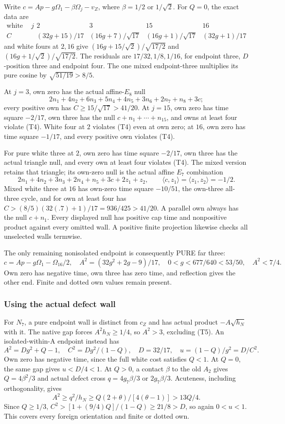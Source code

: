 \documentclass[11pt]{article}
\theoremstyle{definition}
\theoremstyle{remark}
\newcommand{\ip}[2]{\langle #1,#2\rangle}
\begin{document}
Write \(c=Ap-g\Omega_1-\beta\Omega_j-v_Z\), where
\(\beta=1/2\) or \(1/\sqrt2\).  For \(Q=0\), the exact data are
\[
\begin{array}{c|rrrr}
 \text{white three at }j&2&3&15&16\\ \hline
 C&(32g+15)/17&(16g+7)/\sqrt{17}&
   (16g+1)/\sqrt{17}&(32g+1)/17
\end{array}
\]
and white fours at \(2,16\) give
\((16g+15/\sqrt2)/\sqrt{17/2}\) and
\((16g+1/\sqrt2)/\sqrt{17/2}\).
The residuals are \(17/32,1/8,1/16\), for endpoint three,
\(D\)-position three and endpoint four.  The one mixed
endpoint-three multiplies its pure cosine by \(\sqrt{51/19}>8/5\).

At \(j=3\), own zero has the actual affine-\(E_8\) null
\[
 2n_1+4n_2+6n_3+5n_4+4n_5+3n_6+2n_7+n_8+3c;
\]
every positive own has \(C\ge15/\sqrt{17}>41/20\).
At \(j=15\), own zero has time square \(-2/17\), own three
has the null \(c+n_1+\cdots+n_{15}\), and owns at least four
violate (T4).  White four at \(2\) violates (T4) even at own zero;
at \(16\), own zero has time square \(-1/17\), and every
positive own violates (T4).

For pure white three at \(2\), own zero has time square \(-2/17\),
own three has the actual triangle null, and every own at least four
violates (T4).  The mixed version retains that triangle; its own-zero
null is the actual affine \(E_7\) combination
\[
 2n_1+4n_2+3n_3+2n_4+n_5+3c+2z_1+z_2,
 \qquad \ip c{z_1}=\ip{z_1}{z_2}=-1/2.
\]
Mixed white three at \(16\) has own-zero time square \(-10/51\),
the own-three all-three cycle, and for own at least four has
\(C>(8/5)(32(.7)+1)/17=936/425>41/20\).
A parallel own always has the null \(c+n_1\).
Every displayed null has positive cap time and nonpositive product
against every omitted wall.  A positive finite projection likewise
checks all unselected walls termwise.

The only remaining nonisolated endpoint is consequently PURE far three:
\[
 c=Ap-g\Omega_1-\Omega_{16}/2,\quad
 A^2=(32g^2+2g-9)/17,
 \quad 0<g<677/640<53/50,\quad A^2<7/4.              \tag{T5}
\]
Own zero has negative time, own three has zero time, and reflection
gives the other end.  Finite and dotted own values remain present.

\subsubsection{Using the actual defect wall}
For \(N_7\), a pure endpoint wall is distinct from \(c_Z\) and
has actual product \(-A\sqrt{h_N}\) with it.  The native gap
forces \(A^2h_N\ge1/4\), so \(A^2>3\), excluding (T5).
An isolated-within-A endpoint instead has
\[
 A^2=Dg^2+Q-1,\quad C^2=Dg^2/(1-Q),\quad
 D=32/17,\quad u=(1-Q)/g^2=D/C^2.
\]
Own zero has negative time, since the full white cost satisfies \(Q<1\).
At \(Q=0\), the same gap gives \(u<D/4<1\).
At \(Q>0\), a contact \(\beta\) to the old \(A_2\) gives
\(Q=4\beta^2/3\) and actual defect cross
\(q=4g_7\beta/3\) or \(2g_7\beta/3\).
Acuteness, including orthogonality, gives
\[
 A^2\ge q^2/h_N\ge Q(2+\theta)/[4(\theta-1)]>13Q/4.
\]
Since \(Q\ge1/3\),
\(C^2>[1+(9/4)Q]/(1-Q)\ge21/8>D\), so again \(0<u<1\).
This covers every foreign orientation and finite or dotted own.
\end{document}
